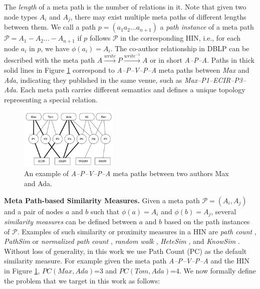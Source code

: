 The \textit{length} of a meta path is the number of relations in it. Note that given two node types $A_i$ and $A_j$, there may exist multiple meta paths of different lengths between them. We call a path $p = (a_1a_2...a_{n+1})$ a \textit{path instance} of a meta path $\mathcal{P} = A_1-A_2... -A_{n+1}$ if $p$ follows $\mathcal{P}$ in the corresponding HIN, i.e., for each node $a_i$ in $p$, we have $\phi(a_i)=A_i$. The co-author relationship in DBLP can be described with the meta path $A\xrightarrow{write}P\xrightarrow{write^{-1}}A$ or in short \textit{A--P--A}. Paths in thick solid lines in Figure \ref{sampleNetwork} correspond to \textit{A--P--V--P--A} meta paths between \textit{Max} and \textit{Ada}, indicating they published in the same venue, such as \textit{Max--P1--ECIR--P3--Ada}. Each meta path carries different semantics and defines a unique topology representing a special relation. %

\begin{figure}[t]
\centering
\includegraphics[width=0.42\textwidth]{figs/exampleSocialNetwork.pdf}
\caption{An example of \textit{A--P--V--P--A} meta paths between two authors Max and Ada.}
\label{sampleNetwork}
\end{figure}


\textbf{Meta Path-based Similarity Measures.} Given a meta path $\mathcal{P} = (A_i,A_j)$ and a pair of nodes $a$ and $b$ such that $\phi(a)=A_i$ and $\phi(b)=A_{j}$, several \textit{similarity measures} can be defined between $a$ and $b$ based on the path instances of $\mathcal{P}$. Examples of such similarity or proximity measures in a HIN are \textit{path count} \cite{sun2011pathsim,sun2011ASONAM}, \textit{PathSim} \cite{sun2011pathsim} or \textit{normalized path count} \cite{sun2011ASONAM}, \textit{random walk} \cite{sun2011ASONAM}, \textit{HeteSim} \cite{shi2014hetesim}, and \textit{KnowSim} \cite{wang2016text}. 
Without loss of generality, in this work we use Path Count (PC) as the default similarity measure. For example given the meta path \textit{A--P--V--P--A} and the HIN in Figure \ref{sampleNetwork}, $PC(Max,Ada)$=3 and $PC(Tom,Ada)$=4. We now formally define the problem that we target in this work as follows:

